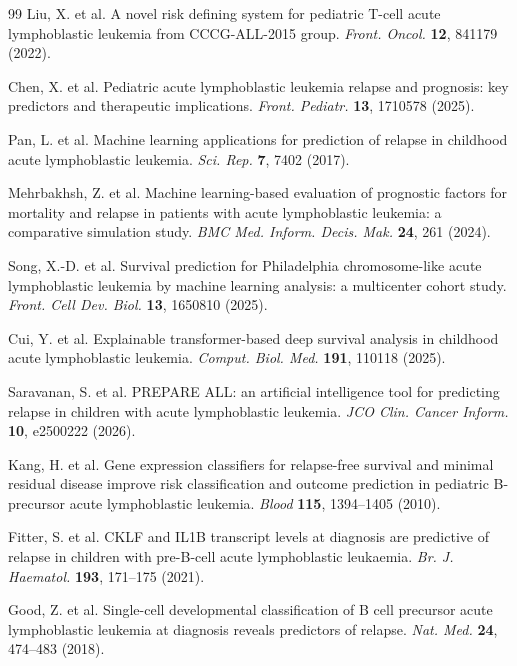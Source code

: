 \documentclass[pdflatex,sn-nature]{sn-jnl}
\begin{document}
\begin{thebibliography}{99}
Liu, X. et al.
A novel risk defining system for pediatric T-cell acute lymphoblastic
leukemia from CCCG-ALL-2015 group.
\textit{Front. Oncol.} \textbf{12}, 841179 (2022).

Chen, X. et al.
Pediatric acute lymphoblastic leukemia relapse and prognosis: key
predictors and therapeutic implications.
\textit{Front. Pediatr.} \textbf{13}, 1710578 (2025).

Pan, L. et al.
Machine learning applications for prediction of relapse in childhood
acute lymphoblastic leukemia.
\textit{Sci. Rep.} \textbf{7}, 7402 (2017).

Mehrbakhsh, Z. et al.
Machine learning-based evaluation of prognostic factors for mortality
and relapse in patients with acute lymphoblastic leukemia: a
comparative simulation study.
\textit{BMC Med. Inform. Decis. Mak.} \textbf{24}, 261 (2024).

Song, X.-D. et al.
Survival prediction for Philadelphia chromosome-like acute
lymphoblastic leukemia by machine learning analysis: a multicenter
cohort study.
\textit{Front. Cell Dev. Biol.} \textbf{13}, 1650810 (2025).

Cui, Y. et al.
Explainable transformer-based deep survival analysis in childhood
acute lymphoblastic leukemia.
\textit{Comput. Biol. Med.} \textbf{191}, 110118 (2025).

Saravanan, S. et al.
PREPARE ALL: an artificial intelligence tool for predicting relapse in
children with acute lymphoblastic leukemia.
\textit{JCO Clin. Cancer Inform.} \textbf{10}, e2500222 (2026).

Kang, H. et al.
Gene expression classifiers for relapse-free survival and minimal
residual disease improve risk classification and outcome prediction in
pediatric B-precursor acute lymphoblastic leukemia.
\textit{Blood} \textbf{115}, 1394--1405 (2010).

Fitter, S. et al.
CKLF and IL1B transcript levels at diagnosis are predictive of
relapse in children with pre-B-cell acute lymphoblastic leukaemia.
\textit{Br. J. Haematol.} \textbf{193}, 171--175 (2021).

Good, Z. et al.
Single-cell developmental classification of B cell precursor acute
lymphoblastic leukemia at diagnosis reveals predictors of relapse.
\textit{Nat. Med.} \textbf{24}, 474--483 (2018).


\end{thebibliography}
\end{document}
